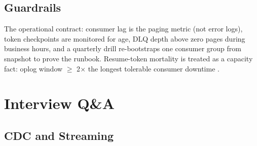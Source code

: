 \subsection{Guardrails}
The operational contract: consumer lag is the paging metric (not error logs), token checkpoints are monitored for age, DLQ depth above zero pages during business hours, and a quarterly drill re-bootstraps one consumer group from snapshot to prove the runbook. Resume-token mortality is treated as a capacity fact: oplog window $\geq$ 2$\times$ the longest tolerable consumer downtime \cite{mongodbChangeStreamsDocs}.

\section{Interview Q\&A}
\subsection{CDC and Streaming}
